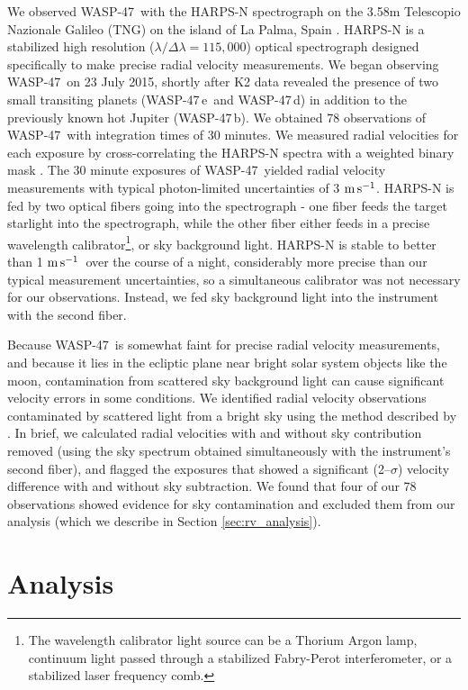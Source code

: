 \documentclass{emulateapj}
\newcommand{\thisstar}{WASP-47}
\newcommand{\thisfirstplanet}{WASP-47\,b}
\newcommand{\thissecondplanet}{WASP-47\,e}
\newcommand{\thisthirdplanet}{WASP-47\,d}
\newcommand{\ms}{\ensuremath{\rm m\,s^{-1}}}
\begin{document}
We observed \thisstar\ with the HARPS-N spectrograph on the 3.58m Telescopio Nazionale Galileo (TNG) on the island of La Palma, Spain \citep{harpsn}. HARPS-N is a stabilized high resolution ($\lambda/\Delta\lambda = 115,000$) optical spectrograph designed specifically to make precise radial velocity measurements. We began observing \thisstar\  on 23 July 2015, shortly after K2 data revealed the presence of two small transiting planets (\thissecondplanet\ and \thisthirdplanet) in addition to the previously known hot Jupiter (\thisfirstplanet). We obtained 78 observations of \thisstar\ with integration times of 30 minutes. We measured radial velocities for each exposure by cross-correlating the HARPS-N spectra with a weighted binary mask \citep{baranne, pepe}.  The 30 minute exposures of \thisstar\ yielded radial velocity measurements with typical photon-limited uncertainties of 3 \ms. HARPS-N is fed by two optical fibers going into the spectrograph - one fiber feeds the target starlight into the spectrograph, while the other fiber either feeds in a precise wavelength calibrator\footnote{The wavelength calibrator light source can be a Thorium Argon lamp, continuum light passed through a stabilized Fabry-Perot interferometer, or a stabilized laser frequency comb.}, or sky background light. HARPS-N is stable to better than 1 \ms\ over the course of a night, considerably more precise than our typical measurement uncertainties, so a simultaneous calibrator was not necessary for our observations. Instead, we fed sky background light into the instrument with the second fiber. 

Because \thisstar\ is somewhat faint for precise radial velocity measurements, and because it lies in the ecliptic plane near bright solar system objects like the moon, contamination from scattered sky background light can cause significant velocity errors in some conditions. We identified radial velocity observations contaminated by scattered light from a bright sky using the method described by \citet{malavolta}. In brief, we calculated radial velocities with and without sky contribution removed (using the sky spectrum obtained simultaneously with the instrument's second fiber), and flagged the exposures that showed a significant (2--$\sigma$) velocity difference with and without sky subtraction. We found that four of our 78 observations showed evidence for sky contamination and excluded them from our analysis (which we describe in Section \ref{sec:rv_analysis}).

\section{Analysis}\label{analysis}
\end{document}
